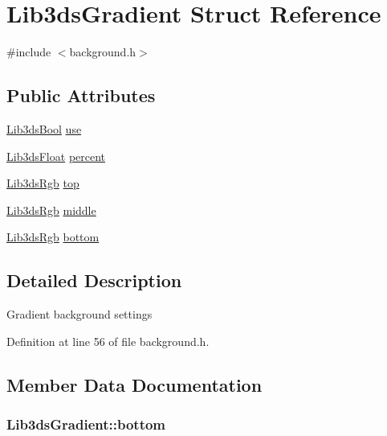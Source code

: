 \hypertarget{struct_lib3ds_gradient}{\section{Lib3ds\-Gradient Struct Reference}
\label{struct_lib3ds_gradient}
}


{\ttfamily \#include $<$background.\-h$>$}

\subsection*{Public Attributes}
\begin{DoxyCompactItemize}
\item 
\hyperlink{types_8h_a89dd7398a9ebbbf28011f8c32df67ad3}{Lib3ds\-Bool} \hyperlink{struct_lib3ds_gradient_a5ca72b08538501858a94d8f945280886}{use}
\item 
\hyperlink{types_8h_ab18e70f51f9a53c9dee8d930c8e1a7bf}{Lib3ds\-Float} \hyperlink{struct_lib3ds_gradient_a8940766aba9f03a0c864a61657cc3cb2}{percent}
\item 
\hyperlink{types_8h_a7e320d64d2488320001f7f3b25168ee3}{Lib3ds\-Rgb} \hyperlink{struct_lib3ds_gradient_afdd3df8e1f27f55c5c0fc32df36cd4d9}{top}
\item 
\hyperlink{types_8h_a7e320d64d2488320001f7f3b25168ee3}{Lib3ds\-Rgb} \hyperlink{struct_lib3ds_gradient_a7d77e755dd671ed110eacb818f3b86ad}{middle}
\item 
\hyperlink{types_8h_a7e320d64d2488320001f7f3b25168ee3}{Lib3ds\-Rgb} \hyperlink{struct_lib3ds_gradient_a219cb88c504c1c2dbcadbf5336da07db}{bottom}
\end{DoxyCompactItemize}


\subsection{Detailed Description}
Gradient background settings 

Definition at line 56 of file background.\-h.



\subsection{Member Data Documentation}
\hypertarget{struct_lib3ds_gradient_a219cb88c504c1c2dbcadbf5336da07db}{
\subsubsection[{bottom}]{ Lib3ds\-Gradient\-::bottom}}\label{struct_lib3ds_gradient_a219cb88c504c1c2dbcadbf5336da07db}


